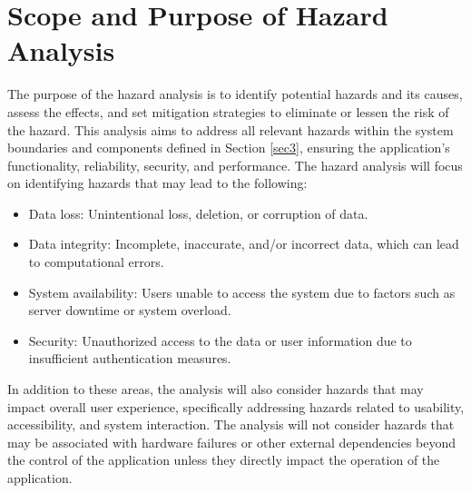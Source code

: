 \documentclass{article}
\begin{document}
\section{Scope and Purpose of Hazard Analysis}

The purpose of the hazard analysis is to identify potential hazards and its
causes, assess the effects, and set mitigation strategies to eliminate or lessen
the risk of the hazard. This analysis aims to address all relevant hazards
within the system boundaries and components defined in Section \ref{sec3},
ensuring the application's functionality, reliability, security, and performance. 
The hazard analysis will focus on identifying hazards that may lead to the
following:
\begin{itemize}
    \item Data loss: Unintentional loss, deletion, or corruption of data.
    \item Data integrity: Incomplete, inaccurate, and/or incorrect data, which
    can lead to computational errors.
    \item System availability: Users unable to access the system due to
    factors such as server downtime or system overload.
    \item Security: Unauthorized access to the data or user information due to
    insufficient authentication measures.
\end{itemize}
In addition to these areas, the analysis will also consider hazards that may
impact overall user experience, specifically addressing hazards related to
usability, accessibility, and system interaction.
The analysis will not consider hazards that may be associated with hardware
failures or other external dependencies beyond the control of the application
unless they directly impact the operation of the application. 
\end{document}
